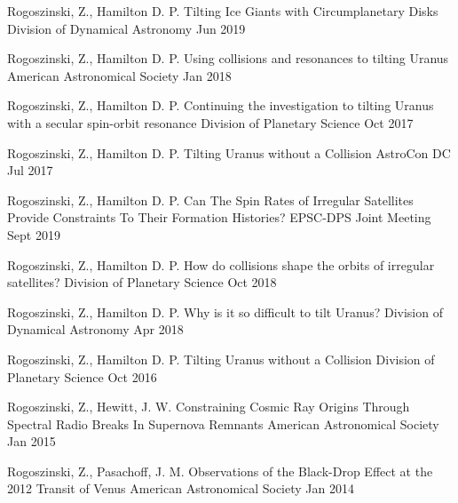 \documentclass[]{awesome-cv}
\begin{document}
\begin{cventries}
	\cventry
	{Rogoszinski, Z., Hamilton D. P.}
	{{Tilting Ice Giants with Circumplanetary Disks}}
	{Division of Dynamical Astronomy}
	{Jun 2019}
	{}
	
	\vspace{-5mm}
	\cventry
	{Rogoszinski, Z., Hamilton D. P.}
	{{Using collisions and resonances to tilting Uranus}}
	{American Astronomical Society }
	{Jan 2018}
	{}
	
	\vspace{-5mm}
	\cventry
	{Rogoszinski, Z., Hamilton D. P.}
	{{Continuing the investigation to tilting Uranus with a secular spin-orbit resonance}}
	{Division of Planetary Science }
	{Oct 2017}
	{}
	
	\vspace{-5mm}
	\cventry
	{Rogoszinski, Z., Hamilton D. P.}
	{Tilting Uranus without a Collision}
	{AstroCon DC }
	{Jul 2017}
	{}	
	
	\vspace{-5mm}
\end{cventries}
\begin{cventries}
	\cventry
	{Rogoszinski, Z., Hamilton D. P.}
	{Can The Spin Rates of Irregular Satellites Provide Constraints To Their Formation Histories? }
	{EPSC-DPS Joint Meeting}
	{Sept 2019}
	{}
	
	\vspace{-5mm}
	\cventry
	{Rogoszinski, Z., Hamilton D. P.}
	{How do collisions shape the orbits of irregular satellites?}
	{Division of Planetary Science}
	{Oct 2018}
	{}
	
	\vspace{-5mm}
	\cventry
	{Rogoszinski, Z., Hamilton D. P.}
	{Why is it so difficult to tilt Uranus?}
	{Division of Dynamical Astronomy}
	{Apr 2018}
	{}
	
	\vspace{-5mm}
	\cventry
	{Rogoszinski, Z., Hamilton D. P.}
	{Tilting Uranus without a Collision}
	{Division of Planetary Science}
	{Oct 2016}
	{}
	
	\vspace{-5mm}
	\cventry
	{Rogoszinski, Z., Hewitt, J. W.}
	{Constraining Cosmic Ray Origins Through Spectral Radio Breaks In Supernova Remnants }
	{American Astronomical Society}
	{Jan 2015}
	{}
	
	\vspace{-5mm}
	\cventry
	{Rogoszinski, Z., Pasachoff, J. M.}
	{Observations of the Black-Drop Effect at the 2012 Transit of Venus }
	{American Astronomical Society}
	{Jan 2014}
	{}
	
	\vspace{-5mm}
\end{cventries}
\end{document}

